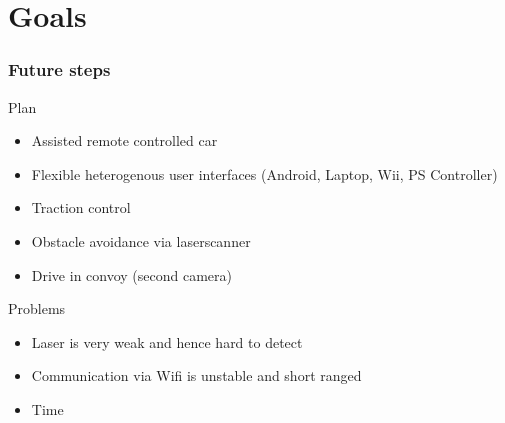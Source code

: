 \documentclass[pdf]{beamer}
\begin{document}
\section{Goals}
\begin{frame}
\frametitle{Future steps}
\begin{exampleblock}{Plan}
\begin{itemize}
\item Assisted remote controlled car
\item Flexible heterogenous user interfaces (Android, Laptop, Wii, PS Controller)
\item Traction control
\item Obstacle avoidance via laserscanner
\item Drive in convoy (second camera)
\end{itemize}
\end{exampleblock}
\begin{alertblock}{Problems}
\begin{itemize}
\item Laser is very weak and hence hard to detect
\item Communication via Wifi is unstable and short ranged
\item Time
\end{itemize}

\end{alertblock}
\end{frame}
\end{document}
